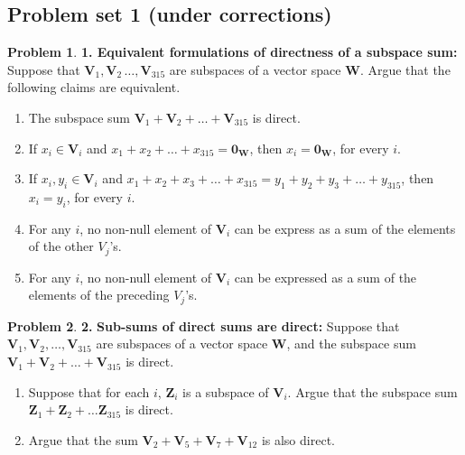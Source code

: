 \documentclass{article}
\theoremstyle{definition}
\newtheorem*{prob*}{Problem}
\newcommand{\V}{\mathbf{V}}
\newcommand{\W}{\mathbf{W}}
\newcommand{\Z}{\mathbf{Z}}
\begin{document}
\subsection{Problem set 1 (under corrections)}
\begin{prob*} \textbf{1. Equivalent formulations of directness of a subspace sum:} Suppose that $\V_1, \V_2\,\dots,\V_{315}$ are subspaces of a vector space $\W$. Argue that the following claims are equivalent. 
	\begin{enumerate}
		\item The subspace sum $\V_1 + \V_2 + \dots + \V_{315}$ is direct. 
		\item If $x_i \in \V_i$ and $x_1 + x_2 + \dots + x_{315} = \mathbf{0}_\W$, then $x_i = \mathbf{0}_\W$, for every $i$.
		\item If $x_i, y_i \in \V_i$ and $x_1 + x_2 + x_3 + \dots + x_{315} = y_1 + y_2 + y_3 + \dots + y_{315}$, then $x_i = y_i$, for every $i$.
		\item For any $i$, no non-null element of $\V_i$ can be express as a sum of the elements of the other $V_j$'s.
		\item For any $i$, no non-null element of $\V_i$ can be expressed as a sum of the elements of the preceding $V_j$'s. 
	\end{enumerate}

\end{prob*}


\newpage

\begin{prob*} \textbf{2.} \textbf{Sub-sums of direct sums are direct: }
	Suppose that $\V_1, \V_2,\dots, \V_{315}$ are subspaces of a vector space $\W$, and the subspace sum $\V_1+\V_2+\dots+\V_{315}$ is direct.
	\begin{enumerate}
		\item Suppose that for each $i$, $\Z_i$ is a subspace of $\V_i$. Argue that the subspace sum $\Z_1 + \Z_2 + \dots \Z_{315}$ is direct. 
		\item Argue that the sum $\V_2 + \V_5 + \V_7 + \V_{12}$ is also direct. 
	\end{enumerate}

\end{prob*}


\newpage
\end{document}
